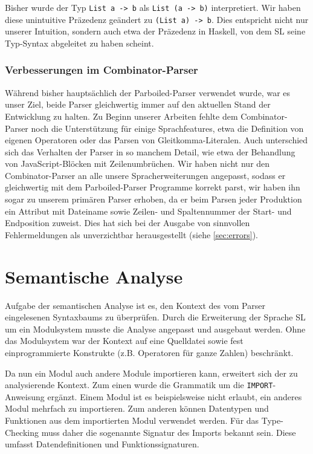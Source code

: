 \documentclass[runningheads]{llncs}
\begin{document}
Bisher wurde der Typ \verb|List a -> b| als \verb|List (a -> b)|
interpretiert.  Wir haben diese unintuitive Präzedenz geändert zu
\verb|(List a) -> b|.  Dies entspricht nicht nur unserer Intuition,
sondern auch etwa der Präzedenz in Haskell, von dem SL seine
Typ-Syntax abgeleitet zu haben scheint. 

\subsubsection{Verbesserungen im Combinator-Parser}

Während bisher hauptsächlich der Parboiled-Parser verwendet wurde, war
es unser Ziel, beide Parser gleichwertig immer auf den aktuellen Stand
der Entwicklung zu halten.  Zu Beginn unserer Arbeiten fehlte dem
Combinator-Parser noch die Unterstützung für einige Sprachfeatures,
etwa die Definition von eigenen Operatoren oder das Parsen von
Gleitkomma-Literalen.  Auch unterschied sich das Verhalten der Parser
in so manchem Detail, wie etwa der Behandlung von JavaScript-Blöcken
mit Zeilenumbrüchen.  Wir haben nicht nur den Combinator-Parser 
an alle unsere Spracherweiterungen angepasst, sodass er gleichwertig
mit dem Parboiled-Parser Programme korrekt parst, wir haben ihn sogar
zu unserem primären Parser erhoben, da er beim Parsen jeder Produktion
ein Attribut mit Dateiname sowie Zeilen- und Spaltennummer der Start-
und Endposition zuweist.  Dies hat sich bei der Ausgabe von sinnvollen
Fehlermeldungen als unverzichtbar herausgestellt (siehe
\ref{sec:errors}).

\section{Semantische Analyse}
\label{sec:semantics}

Aufgabe der semantischen Analyse ist es, den Kontext des vom Parser eingelesenen Syntaxbaums zu überprüfen. Durch die Erweiterung der Sprache SL um ein Modulsystem musste die Analyse angepasst und ausgebaut werden. Ohne das Modulsystem war der Kontext auf eine Quelldatei sowie fest einprogrammierte Konstrukte (z.B. Operatoren für ganze Zahlen) beschränkt.

Da nun ein Modul auch andere Module importieren kann, erweitert sich der zu analysierende Kontext. Zum einen wurde die Grammatik um die \verb|IMPORT|-Anweisung ergänzt. Einem Modul ist es beispielsweise nicht erlaubt, ein anderes Modul mehrfach zu importieren. Zum anderen können Datentypen und Funktionen aus dem importierten Modul verwendet werden. Für das Type-Checking muss daher die sogenannte Signatur des Imports bekannt sein. Diese umfasst Datendefinitionen und Funktionssignaturen.
\end{document}
